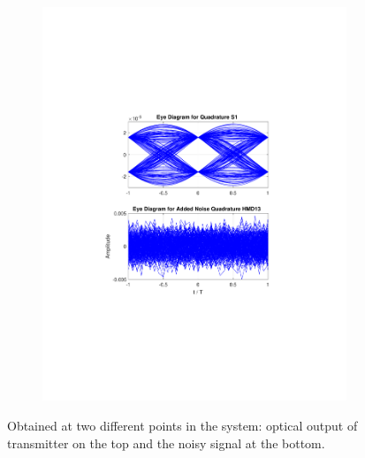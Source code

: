 \begin{figure}[H]
\begin{minipage}{\linewidth}
\begin{subfigure}{.45\textwidth}
		\includegraphics[clip, trim=5cm 7cm 5cm 7cm, width=\textwidth]{./sdf/m_qam_system/figures/eyes/q_n_nmf_60_60_rc_03.pdf}
	\end{subfigure}
	
	\caption{
		Obtained
		at two different points in the system: optical output of transmitter on the top and
		the noisy signal at the bottom.
		\label{fig:eyes_n_rrc_60_03}}
	\end{minipage}
\end{figure}
